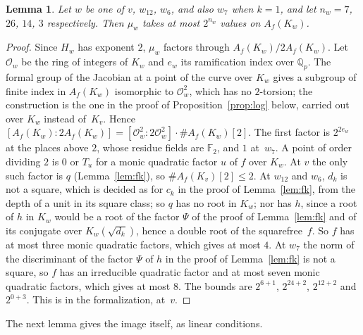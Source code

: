\documentclass[11pt]{amsart}
\newtheorem{lemma}[theorem]{Lemma}
\theoremstyle{definition}
\numberwithin{equation}{section}
\newcommand{\Q}{\mathbb{Q}}
\newcommand{\F}{\mathbb{F}}
\newcommand{\kv}{K_v}
\newcommand{\lean}[1]{\ignorespaces}
\begin{document}
\begin{lemma}\label{lem:count}\lean{FurioLombardo.Discharge.SelmerBasis.Count.countBound_v, FurioLombardo.Discharge.SelmerBasis.Count.countBound_w2, FurioLombardo.Discharge.SelmerBasis.Count.countBound_w3, FurioLombardo.Discharge.SelmerBasis.Count.countBound_w7}
Let $w$ be one of $v$, $w_{12}$, $w_6$, and also $w_7$ when $k=1$, and let $n_w=7$, $26$, $14$, $3$ respectively. Then $\mu_w$ takes at most $2^{n_w}$ values on $A_f(K_w)$.
\end{lemma}

\begin{proof}
Since $H_w$ has exponent $2$, $\mu_w$ factors through $A_f(K_w)/2A_f(K_w)$. Let $\mathcal O_w$ be the ring of integers of $K_w$ and $e_w$ its ramification index over $\Q_p$. The formal group of the Jacobian at a point of the curve over $K_w$ gives a subgroup of finite index in $A_f(K_w)$ isomorphic to $\mathcal O_w^2$, which has no $2$-torsion; the construction is the one in the proof of Proposition~\ref{prop:log} below, carried out over $K_w$ instead of~$\kv$. Hence $[A_f(K_w):2A_f(K_w)]=[\mathcal O_w^2:2\mathcal O_w^2]\cdot\#A_f(K_w)[2]$. The first factor is $2^{2e_w}$ at the places above $2$, whose residue fields are $\F_2$, and $1$ at~$w_7$. A point of order dividing $2$ is $0$ or $T_u$ for a monic quadratic factor $u$ of $f$ over $K_w$. At $v$ the only such factor is $q$ (Lemma~\ref{lem:fk}), so $\#A_f(K_v)[2]\le2$. At $w_{12}$ and $w_6$, $d_k$ is not a square, which is decided as for $c_k$ in the proof of Lemma~\ref{lem:fk}, from the depth of a unit in its square class; so $q$ has no root in $K_w$; nor has $h$, since a root of $h$ in $K_w$ would be a root of the factor $\Psi$ of the proof of Lemma~\ref{lem:fk} and of its conjugate over $K_w(\sqrt{d_k})$, hence a double root of the squarefree~$f$. So $f$ has at most three monic quadratic factors, which gives at most $4$. At $w_7$ the norm of the discriminant of the factor $\Psi$ of $h$ in the proof of Lemma~\ref{lem:fk} is not a square, so $f$ has an irreducible quadratic factor and at most seven monic quadratic factors, which gives at most $8$. The bounds are $2^{6+1}$, $2^{24+2}$, $2^{12+2}$ and $2^{0+3}$. This is  in the formalization, at~$v$.
\end{proof}

The next lemma gives the image itself, as linear conditions.
\end{document}
